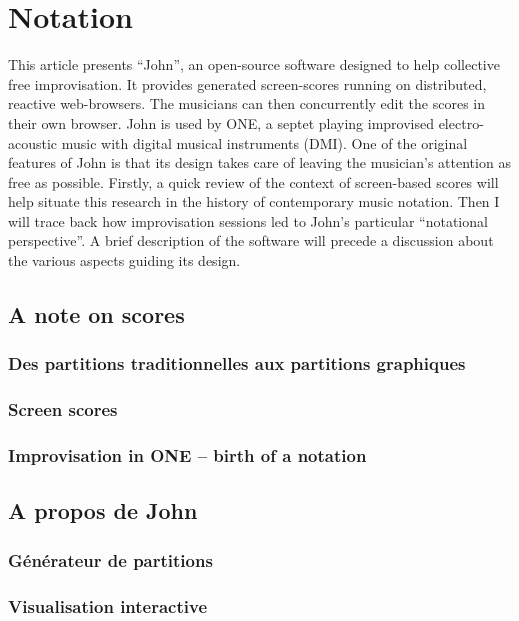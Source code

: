 %
\chapter{Notation}
\label{ch:notation}


This article presents “John”, an open-source software designed to help collective free improvisation. It provides generated screen-scores running on distributed, reactive web-browsers. The musicians can then concurrently edit the scores in their own browser. John is used by ONE, a septet playing improvised electro-acoustic music with digital musical instruments (DMI). One of the original features of John is that its design takes care of leaving the
musician's attention as free as possible.
Firstly, a quick review of the context of screen-based
scores will help situate this research in the history of contemporary music notation. Then I will trace back how improvisation sessions led to John's particular “notational perspective”. A brief description of the software will precede a discussion about the various aspects guiding its
design.


\section{A note on scores}
\subsection{Des partitions traditionnelles aux partitions graphiques}
\subsection{Screen scores}
\subsection{Improvisation in ONE – birth of a notation}

\section{A propos de John}
\subsection{Générateur de partitions}
\subsection{Visualisation interactive}
